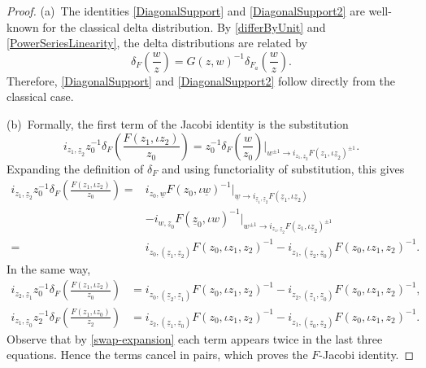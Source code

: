 \documentclass[10pt,a4paper]{amsart}
\numberwithin{equation}{section}
\theoremstyle{definition}
\begin{document}
\begin{proof}
(a)~The identities \eqref{DiagonalSupport} and \eqref{DiagonalSupport2} are well-known for the classical delta distribution. By \eqref{differByUnit} and \eqref{PowerSeriesLinearity}, the delta distributions are related by
\begin{equation}
\label{deFdeAdditive}
 \delta_F\left(\frac{w}{z}\right)=G(z,w)^{-1}\delta_{F_a}\left(\frac{w}{z}\right).
\end{equation}
Therefore, \eqref{DiagonalSupport} and \eqref{DiagonalSupport2} follow directly from the classical case.

(b)~Formally, the first term of the Jacobi identity is the substitution
\[
 i_{z_1,\underline z_2}z_0^{-1}\delta_F\left(\frac{F(z_1,\iota z_2)}{z_0}\right)
 =z_0^{-1}\delta_F\left(\frac{w}{z_0}\right)\Big|_{w^{\pm1}\to i_{z_1,\underline z_2}F(z_1,\iota \underline z_2)^{\pm1}}.
\]
Expanding the definition of $\delta_F$ and using functoriality of substitution, this gives
 \begin{align*}
 i_{z_1,\underline z_2}z_0^{-1}\delta_F\left(\frac{F(z_1,\iota z_2)}{z_0}\right)={}&
i_{z_0,\underline w}F(z_0,\iota\underline w)^{-1}\big|_{\underline w\to i_{\underline z_1, \underline z_2} F(\underline z_1,\iota \underline z_2)}\\
&-i_{w,\underline z_0}F(\underline z_0,\iota w)^{-1}\big|_{w^{\pm1}\to i_{z_1, \underline z_2} F(z_1,\iota \underline z_2)^{\pm1}}\\
={}&i_{z_0,(\underline z_1, \underline z_2)} F(z_0,\iota z_1, z_2)^{-1}-i_{z_1,(\underline z_2, \underline z_0)} F(z_0,\iota z_1, z_2)^{-1}.
 \end{align*}
In the same way,
\begin{align*}
 i_{z_2,\underline z_1}z_0^{-1}\delta_F\left(\frac{F(z_1,\iota z_2)}{z_0}\right)
 &=i_{z_0,(\underline z_2,\underline z_1)}F(z_0,\iota z_1, z_2)^{-1}-i_{z_2,(\underline z_1,\underline z_0)}F(z_0,\iota z_1, z_2)^{-1},\\
 i_{z_1,\underline z_0}z_2^{-1}\delta_F\left(\frac{F(z_1,\iota z_0)}{z_2}\right)
 &=i_{z_2,(\underline z_1, \underline z_0)}F(z_0,\iota z_1, z_2)^{-1}-i_{z_1,(\underline z_0, \underline z_2)}F(z_0,\iota z_1, z_2)^{-1}.
\end{align*}
Observe that by \eqref{swap-expansion} each term appears twice in the last three equations. Hence the terms cancel in pairs, which proves the $F$-Jacobi identity.


\end{proof}
\end{document}
